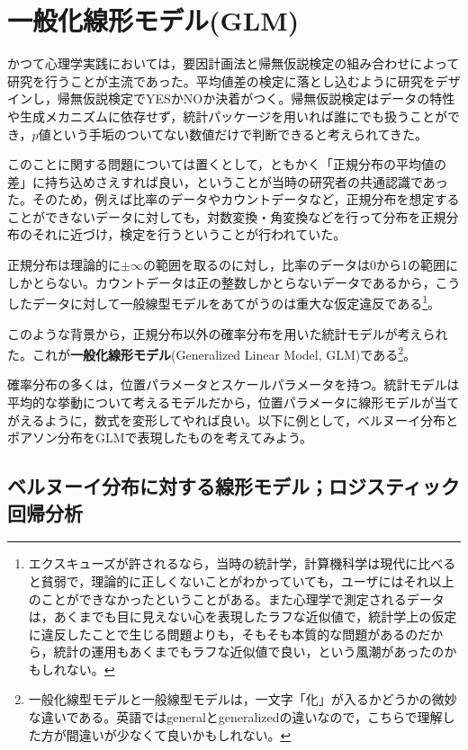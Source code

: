 \documentclass[
  a4paper,
]{ltjsbook}
\begin{document}
\section{一般化線形モデル(GLM)}\label{ux4e00ux822cux5316ux7ddaux5f62ux30e2ux30c7ux30ebglm}

かつて心理学実践においては，要因計画法と帰無仮説検定の組み合わせによって研究を行うことが主流であった。平均値差の検定に落とし込むように研究をデザインし，帰無仮説検定でYESかNOか決着がつく。帰無仮説検定はデータの特性や生成メカニズムに依存せず，統計パッケージを用いれば誰にでも扱うことができ，\(p\)値という手垢のついてない数値だけで判断できると考えられてきた。

このことに関する問題については置くとして，ともかく「正規分布の平均値の差」に持ち込めさえすれば良い，ということが当時の研究者の共通認識であった。そのため，例えば比率のデータやカウントデータなど，正規分布を想定することができないデータに対しても，対数変換・角変換などを行って分布を正規分布のそれに近づけ，検定を行うということが行われていた。

正規分布は理論的に\(\pm \infty\)の範囲を取るのに対し，比率のデータは0から1の範囲にしかとらない。カウントデータは正の整数しかとらないデータであるから，こうしたデータに対して一般線型モデルをあてがうのは重大な仮定違反である\footnote{エクスキューズが許されるなら，当時の統計学，計算機科学は現代に比べると貧弱で，理論的に正しくないことがわかっていても，ユーザにはそれ以上のことができなかったということがある。また心理学で測定されるデータは，あくまでも目に見えない心を表現したラフな近似値で，統計学上の仮定に違反したことで生じる問題よりも，そもそも本質的な問題があるのだから，統計の運用もあくまでもラフな近似値で良い，という風潮があったのかもしれない。}。

このような背景から，正規分布以外の確率分布を用いた統計モデルが考えられた。これが\textbf{一般化線形モデル}(Generalized
Linear Model, GLM)である\footnote{一般化線型モデルと一般線型モデルは，一文字「化」が入るかどうかの微妙な違いである。英語ではgeneralとgeneralizedの違いなので，こちらで理解した方が間違いが少なくて良いかもしれない。}。

確率分布の多くは，位置パラメータとスケールパラメータを持つ。統計モデルは平均的な挙動について考えるモデルだから，位置パラメータに線形モデルが当てがえるように，数式を変形してやれば良い。以下に例として，ベルヌーイ分布とポアソン分布をGLMで表現したものを考えてみよう。

\subsection{ベルヌーイ分布に対する線形モデル；ロジスティック回帰分析}\label{ux30d9ux30ebux30ccux30fcux30a4ux5206ux5e03ux306bux5bfeux3059ux308bux7ddaux5f62ux30e2ux30c7ux30ebux30edux30b8ux30b9ux30c6ux30a3ux30c3ux30afux56deux5e30ux5206ux6790}
\end{document}

